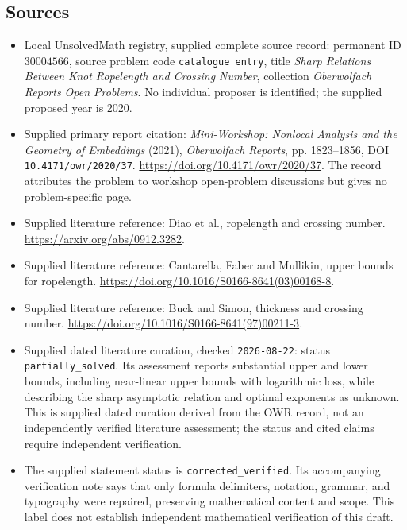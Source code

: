 \documentclass[11pt]{article}
\begin{document}
\subsection{Sources}
\begin{itemize}
\item Local UnsolvedMath registry, supplied complete source record: permanent ID \(30004566\), source problem code \texttt{catalogue entry}, title \emph{Sharp Relations Between Knot Ropelength and Crossing Number}, collection \emph{Oberwolfach Reports Open Problems}. No individual proposer is identified; the supplied proposed year is 2020.
\item Supplied primary report citation: \emph{Mini-Workshop: Nonlocal Analysis and the Geometry of Embeddings} (2021), \emph{Oberwolfach Reports}, pp. 1823--1856, DOI \texttt{10.4171/owr/2020/37}. \url{https://doi.org/10.4171/owr/2020/37}. The record attributes the problem to workshop open-problem discussions but gives no problem-specific page.
\item Supplied literature reference: Diao et al., ropelength and crossing number. \url{https://arxiv.org/abs/0912.3282}.
\item Supplied literature reference: Cantarella, Faber and Mullikin, upper bounds for ropelength. \url{https://doi.org/10.1016/S0166-8641(03)00168-8}.
\item Supplied literature reference: Buck and Simon, thickness and crossing number. \url{https://doi.org/10.1016/S0166-8641(97)00211-3}.
\item Supplied dated literature curation, checked \texttt{2026-08-22}: status \texttt{partially\_solved}. Its assessment reports substantial upper and lower bounds, including near-linear upper bounds with logarithmic loss, while describing the sharp asymptotic relation and optimal exponents as unknown. This is supplied dated curation derived from the OWR record, not an independently verified literature assessment; the status and cited claims require independent verification.
\item The supplied statement status is \texttt{corrected\_verified}. Its accompanying verification note says that only formula delimiters, notation, grammar, and typography were repaired, preserving mathematical content and scope. This label does not establish independent mathematical verification of this draft.
\end{itemize}
\end{document}
